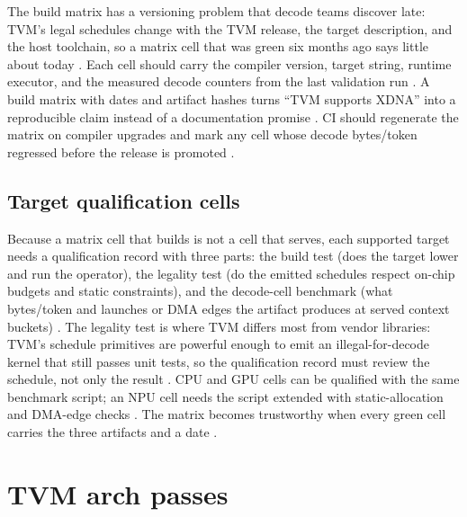 The build matrix has a versioning problem that decode teams discover late: TVM's legal schedules change with the TVM release, the target description, and the host toolchain, so a matrix cell that was green six months ago says little about today \citep{chen2018tvm,chen2020compilerbasedhardw}. Each cell should carry the compiler version, target string, runtime executor, and the measured decode counters from the last validation run \citep{memoryfloor2026,taxbreak2026}. A build matrix with dates and artifact hashes turns ``TVM supports XDNA'' into a reproducible claim instead of a documentation promise \citep{amd2024xdna,yirage2026}. CI should regenerate the matrix on compiler upgrades and mark any cell whose decode bytes/token regressed before the release is promoted \citep{patel2025llminference,memoryfloor2026}.

\subsection{Target qualification cells}

Because a matrix cell that builds is not a cell that serves, each supported target needs a qualification record with three parts: the build test (does the target lower and run the operator), the legality test (do the emitted schedules respect on-chip budgets and static constraints), and the decode-cell benchmark (what bytes/token and launches or DMA edges the artifact produces at served context buckets) \citep{chen2018tvm,amd2024xdna,memoryfloor2026}. The legality test is where TVM differs most from vendor libraries: TVM's schedule primitives are powerful enough to emit an illegal-for-decode kernel that still passes unit tests, so the qualification record must review the schedule, not only the result \citep{amd2024aie,yirage2026,chen2020compilerbasedhardw}. CPU and GPU cells can be qualified with the same benchmark script; an NPU cell needs the script extended with static-allocation and DMA-edge checks \citep{amd2024xdna,patel2025llminference}. The matrix becomes trustworthy when every green cell carries the three artifacts and a date \citep{taxbreak2026,memoryfloor2026}.

\section{TVM arch passes}
\label{sec:ch16_tvm_arch_passes}


